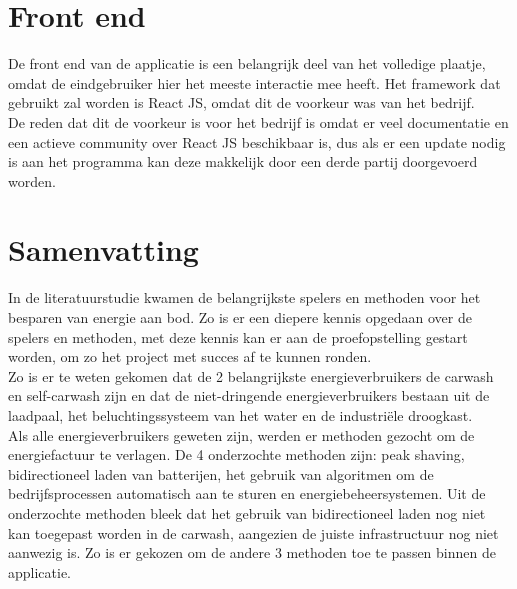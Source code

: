 \section{Front end}
\label{sec:stand-van-zaken-front-end}

De front end van de applicatie is een belangrijk deel van het volledige plaatje, omdat de eindgebruiker hier het meeste interactie mee heeft. Het framework dat gebruikt zal worden is React JS, omdat dit de voorkeur was van het bedrijf.\\

De reden dat dit de voorkeur is voor het bedrijf is omdat er veel documentatie en een actieve community over React JS beschikbaar is, dus als er een update nodig is aan het programma kan deze makkelijk door een derde partij doorgevoerd worden.

\section{Samenvatting}
\label{sec:stand-van-zaken-samenvatting}

In de literatuurstudie kwamen de belangrijkste spelers en methoden voor het besparen van energie aan bod. Zo is er een diepere kennis opgedaan over de spelers en methoden, met deze kennis kan er aan de proefopstelling gestart worden, om zo het project met succes af te kunnen ronden.\\

Zo is er te weten gekomen dat de 2 belangrijkste energieverbruikers de carwash en self-carwash zijn en dat de niet-dringende energieverbruikers bestaan uit de laadpaal, het beluchtingssysteem van het water en de industriële droogkast.\\

Als alle energieverbruikers geweten zijn, werden er methoden gezocht om de energiefactuur te verlagen. De 4 onderzochte methoden zijn: peak shaving, bidirectioneel laden van batterijen, het gebruik van algoritmen om de bedrijfsprocessen automatisch aan te sturen en energiebeheersystemen. Uit de onderzochte methoden bleek dat het gebruik van bidirectioneel laden nog niet kan toegepast worden in de carwash, aangezien de juiste infrastructuur nog niet aanwezig is. Zo is er gekozen om de andere 3 methoden toe te passen binnen de applicatie.\\

